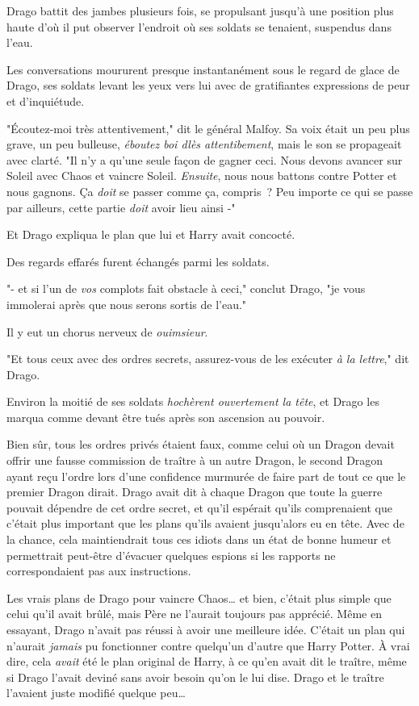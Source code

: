 Drago battit des jambes plusieurs fois, se propulsant jusqu'à une position plus haute d'où il put observer l'endroit où ses soldats se tenaient, suspendus dans l'eau.

Les conversations moururent presque instantanément sous le regard de glace de Drago, ses soldats levant les yeux vers lui avec de gratifiantes expressions de peur et d'inquiétude.

"Écoutez-moi très attentivement," dit le général Malfoy. Sa voix était un peu plus grave, un peu bulleuse, \emph{éboutez boi dlès attentibement}, mais le son se propageait avec clarté. "Il n'y a qu'une seule façon de gagner ceci. Nous devons avancer sur Soleil avec Chaos et vaincre Soleil. \emph{Ensuite}, nous nous battons contre Potter et nous gagnons. Ça \emph{doit} se passer comme ça, compris~? Peu importe ce qui se passe par ailleurs, cette partie \emph{doit} avoir lieu ainsi -"

Et Drago expliqua le plan que lui et Harry avait concocté.

Des regards effarés furent échangés parmi les soldats.

"- et si l'un de \emph{vos} complots fait obstacle à ceci," conclut Drago, "je vous immolerai après que nous serons sortis de l'eau."

Il y eut un chorus nerveux de \emph{ouimsieur}.

"Et tous ceux avec des ordres secrets, assurez-vous de les exécuter \emph{à la lettre}," dit Drago.

Environ la moitié de ses soldats \emph{hochèrent ouvertement la tête}, et Drago les marqua comme devant être tués après son ascension au pouvoir.

Bien sûr, tous les ordres privés étaient faux, comme celui où un Dragon devait offrir une fausse commission de traître à un autre Dragon, le second Dragon ayant reçu l'ordre lors d'une confidence murmurée de faire part de tout ce que le premier Dragon dirait. Drago avait dit à chaque Dragon que toute la guerre pouvait dépendre de cet ordre secret, et qu'il espérait qu'ils comprenaient que c'était plus important que les plans qu'ils avaient jusqu'alors eu en tête. Avec de la chance, cela maintiendrait tous ces idiots dans un état de bonne humeur et permettrait peut-être d'évacuer quelques espions si les rapports ne correspondaient pas aux instructions.

Les vrais plans de Drago pour vaincre Chaos… et bien, c'était plus simple que celui qu'il avait brûlé, mais Père ne l'aurait toujours pas apprécié. Même en essayant, Drago n'avait pas réussi à avoir une meilleure idée. C'était un plan qui n'aurait \emph{jamais} pu fonctionner contre quelqu'un d'autre que Harry Potter. À vrai dire, cela \emph{avait} été le plan original de Harry, à ce qu'en avait dit le traître, même si Drago l'avait deviné sans avoir besoin qu'on le lui dise. Drago et le traître l'avaient juste modifié quelque peu…

